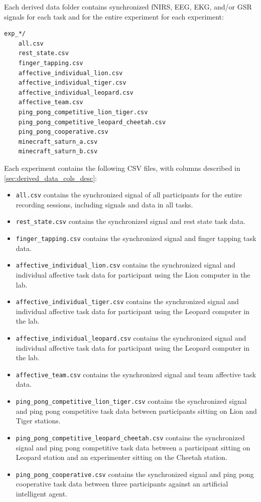 Each derived data folder contains synchronized fNIRS, EEG, EKG, and/or GSR signals for each task and for the entire experiment for each experiment:
\begin{verbatim}
exp_*/
    all.csv
    rest_state.csv
    finger_tapping.csv
    affective_individual_lion.csv
    affective_individual_tiger.csv
    affective_individual_leopard.csv
    affective_team.csv
    ping_pong_competitive_lion_tiger.csv
    ping_pong_competitive_leopard_cheetah.csv
    ping_pong_cooperative.csv
    minecraft_saturn_a.csv
    minecraft_saturn_b.csv
\end{verbatim}

Each experiment contains the following CSV files, with columns described in \ref{sec:derived_data_cols_desc}:
%
\begin{itemize}
  \item \texttt{all.csv} contains the synchronized signal of all participants for the entire recording sessions, including signals and data in all tasks.
  \item \texttt{rest\_state.csv} contains the synchronized signal and rest state task data.
  \item \texttt{finger\_tapping.csv} contains the synchronized signal and finger tapping task data.
  \item \texttt{affective\_individual\_lion.csv} contains the synchronized signal and individual affective task data for participant using the Lion computer in the lab.
  \item \texttt{affective\_individual\_tiger.csv} contains the synchronized signal and individual affective task data for participant using the Leopard computer in the lab.
  \item \texttt{affective\_individual\_leopard.csv} contains the synchronized signal and individual affective task data for participant using the Leopard computer in the lab.
  \item \texttt{affective\_team.csv} contains the synchronized signal and team affective task data.
  \item \texttt{ping\_pong\_competitive\_lion\_tiger.csv} contains the synchronized signal and ping pong competitive task data between participants sitting on Lion and Tiger stations.
  \item \texttt{ping\_pong\_competitive\_leopard\_cheetah.csv} contains the synchronized signal and ping pong competitive task data between a participant sitting on Leopard station and an experimenter sitting on the Cheetah station.
  \item \texttt{ping\_pong\_cooperative.csv} contains the synchronized signal and ping pong cooperative task data between three participants against an artificial intelligent agent.

\end{itemize}
